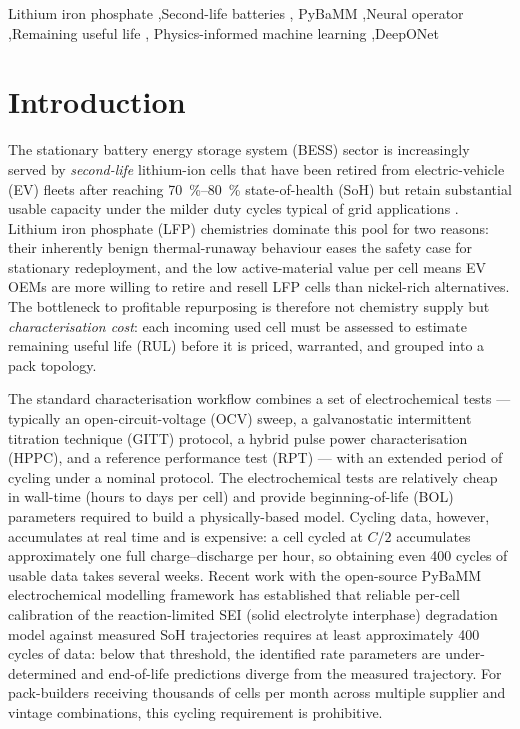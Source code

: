 \documentclass[preprint,12pt,3p,authoryear]{elsarticle}
\begin{document}
\begin{frontmatter}
\begin{keyword}
Lithium iron phosphate \sep Second-life batteries \sep
PyBaMM \sep Neural operator \sep Remaining useful life \sep
Physics-informed machine learning \sep DeepONet
\end{keyword}

\end{frontmatter}

\linenumbers

\section{Introduction}
\label{sec:intro}

The stationary battery energy storage system (BESS) sector is
increasingly served by \emph{second-life} lithium-ion cells that have
been retired from electric-vehicle (EV) fleets after reaching
\qty{70}{\percent}--\qty{80}{\percent} state-of-health (SoH) but retain
substantial usable capacity under the milder duty cycles typical of
grid applications \citep{martinez2021second, hossain2019comprehensive}.
Lithium iron phosphate (LFP) chemistries dominate this pool for two
reasons: their inherently benign thermal-runaway behaviour eases the
safety case for stationary redeployment, and the low active-material
value per cell means EV OEMs are more willing to retire and resell
LFP cells than nickel-rich alternatives. The bottleneck to profitable
repurposing is therefore not chemistry supply but \emph{characterisation
cost}: each incoming used cell must be assessed to estimate remaining
useful life (RUL) before it is priced, warranted, and grouped into a
pack topology.

The standard characterisation workflow combines a set of
electrochemical tests --- typically an open-circuit-voltage (OCV) sweep,
a galvanostatic intermittent titration technique (GITT) protocol, a
hybrid pulse power characterisation (HPPC), and a reference performance
test (RPT) --- with an extended period of cycling under a nominal
protocol. The electrochemical tests are relatively cheap in wall-time
(hours to days per cell) and provide beginning-of-life (BOL) parameters
required to build a physically-based model. Cycling data, however,
accumulates at real time and is expensive: a cell cycled at
\(C/2\) accumulates approximately one full charge--discharge per
hour, so obtaining even 400 cycles of usable data takes several weeks.
Recent work with the open-source PyBaMM \citep{sulzer2021pybamm}
electrochemical modelling framework has established that reliable
per-cell calibration of the reaction-limited SEI (solid electrolyte
interphase) degradation model \citep{prada2013simplified,
ramadass2004firstprinciples} against measured SoH trajectories requires
at least approximately \num{400} cycles of data: below that
threshold, the identified rate parameters are under-determined and
end-of-life predictions diverge from the measured trajectory. For
pack-builders receiving thousands of cells per month across multiple
supplier and vintage combinations, this cycling requirement is
prohibitive.
\end{document}
